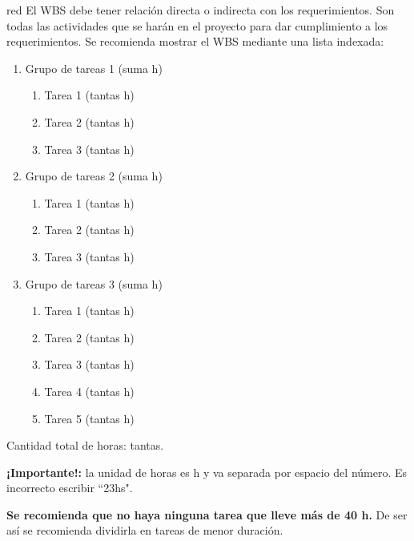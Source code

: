 \begin{consigna}{red}
	El WBS debe tener relación directa o indirecta con los requerimientos.  Son todas las actividades que se harán en el proyecto para dar cumplimiento a los requerimientos. Se recomienda mostrar el WBS mediante una lista indexada:

	\begin{enumerate}
		\item Grupo de tareas 1 (suma h)
		      \begin{enumerate}
			      \item Tarea 1 (tantas h)
			      \item Tarea 2 (tantas h)
			      \item Tarea 3 (tantas h)
		      \end{enumerate}
		\item Grupo de tareas 2 (suma h)
		      \begin{enumerate}
			      \item Tarea 1 (tantas h)
			      \item Tarea 2 (tantas h)
			      \item Tarea 3 (tantas h)
		      \end{enumerate}
		\item Grupo de tareas 3 (suma h)
		      \begin{enumerate}
			      \item Tarea 1 (tantas h)
			      \item Tarea 2 (tantas h)
			      \item Tarea 3 (tantas h)
			      \item Tarea 4 (tantas h)
			      \item Tarea 5 (tantas h)
		      \end{enumerate}
	\end{enumerate}

	Cantidad total de horas: tantas.

	\textbf{¡Importante!:} la unidad de horas es h y va separada por espacio del número. Es incorrecto escribir ``23hs".

	\textbf{Se recomienda que no haya ninguna tarea que lleve más de 40 h.} De ser así se recomienda dividirla en tareas de menor duración.

\end{consigna}
